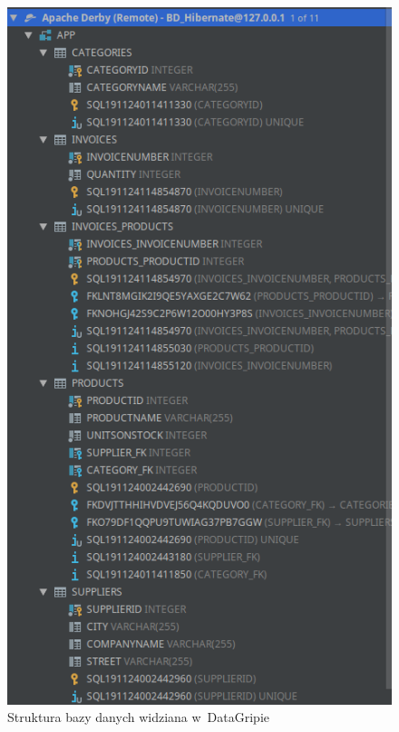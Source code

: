 \documentclass[12pt, a4paper]{mwart}
\begin{document}
\begin{figure}[ht]
  \centering
  \includegraphics[scale=0.60]{VII/7-2.png}
  \caption{Struktura bazy danych widziana w~DataGripie}
  \label{rys:7.2}
\end{figure}
\end{document}
